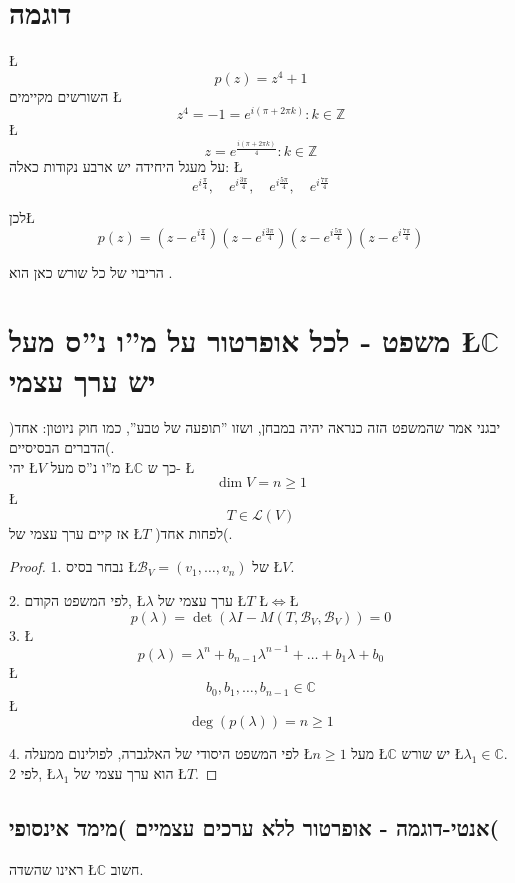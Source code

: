 \documentclass[english,hebrew]{article}
\theoremstyle{plain}
\begin{document}
\section{דוגמה}

\L{%
\[
p(z)=z^{4}+1
\]
}%
השורשים מקיימים \L{%
\[
z^{4}=-1=e^{i\left(\pi+2\pi k\right)}:k\in\mathbb{Z}
\]
}%
\L{%
\[
z=e^{\frac{i\left(\pi+2\pi k\right)}{4}}:k\in\mathbb{Z}
\]
}%
 על מעגל היחידה יש ארבע נקודות כאלה: \L{%
\[
e^{i\frac{\pi}{4}},\quad e^{i\frac{3\pi}{4}},\quad e^{i\frac{5\pi}{4}},\quad e^{i\frac{7\pi}{4}}
\]
}%

לכן\L{%
\[
p(z)=(z-e^{i\frac{\pi}{4}})(z-e^{i\frac{3\pi}{4}})(z-e^{i\frac{5\pi}{4}})(z-e^{i\frac{7\pi}{4}})
\]
}%

הריבוי של כל שורש כאן הוא {\endL}.

\section{משפט - לכל אופרטור על מ\textquotedblright ו נ\textquotedblright ס
מעל \L{$\mathbb{C}$} יש ערך עצמי}

)יבגני אמר שהמשפט הזה כנראה יהיה במבחן, ושזו \textquotedblright תופעה
של טבע\textquotedblright , כמו חוק ניוטון: אחד הדברים הבסיסיים(.\\

יהי \L{$V$} מ\textquotedblright ו נ\textquotedblright ס מעל \L{$\mathbb{C}$}
כך ש- \L{%
\[
\dim V=n\geq1
\]
}%
\L{%
\[
T\in\mathcal{L}(V)
\]
}%
אז קיים ערך עצמי של \L{$T$} )לפחות אחד(.
\begin{proof}
1. נבחר בסיס \L{$\mathcal{B}_{V}=(v_{1},\dots,v_{n})$} של \L{$V$}.

2. לפי המשפט הקודם, \L{$\lambda$} ערך עצמי של \L{$T$} \L{$\iff$}\L{%
\[
p(\lambda)=\det(\lambda I-M(T,\mathcal{B}_{V},\mathcal{B}_{V}))=0
\]
}%
3. \L{%
\[
p(\lambda)=\lambda^{n}+b_{n-1}\lambda^{n-1}+\dots+b_{1}\lambda+b_{0}
\]
}%
\L{%
\[
b_{0},b_{1},\dots,b_{n-1}\in\mathbb{C}
\]
}%
\L{%
\[
\deg(p(\lambda))=n\geq1
\]
}%

4. לפי המשפט היסודי של האלגברה, לפולינום ממעלה \L{$n\geq1$} מעל \L{$\mathbb{C}$}
יש שורש \L{$\lambda_{1}\in\mathbb{C}$}. לפי 2, \L{$\lambda_{1}$}
הוא ערך עצמי של \L{$T$}. 
\end{proof}

\subsection{אנטי-דוגמה - אופרטור ללא ערכים עצמיים )מימד אינסופי(}

ראינו שהשדה \L{$\mathbb{C}$} חשוב.
\end{document}
